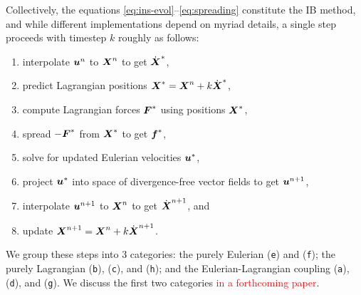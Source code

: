 Collectively, the equations \eqref{eq:ins-evol}--\eqref{eq:spreading} constitute the
IB method, and while different implementations depend on myriad details, a single step
proceeds with timestep $k$ roughly as follows:
\begin{enumerate}[label=(\texttt{\alph*})]
    \item interpolate $\boldsymbol{u}^n$ to $\boldsymbol{X}^n$ to get $\dot{\boldsymbol{X}}^\ast$,
    \item predict Lagrangian positions $\boldsymbol{X}^\ast = \boldsymbol{X}^n + k\dot{\boldsymbol{X}}^\ast$,
    \item compute Lagrangian forces $\boldsymbol{F}^\ast$ using positions $\boldsymbol{X}^\ast$,
    \item spread $-\boldsymbol{F}^\ast$ from $\boldsymbol{X}^\ast$ to get $\boldsymbol{f}^\ast$,
    \item solve for updated Eulerian velocities $\boldsymbol{u}^\ast$,
    \item project $\boldsymbol{u}^\ast$ into space of divergence-free vector fields to get
        $\boldsymbol{u}^{n+1}$,
    \item interpolate $\boldsymbol{u}^{n+1}$ to $\boldsymbol{X}^n$ to get $\dot{\boldsymbol{X}}^{n+1}$, and
    \item update $\boldsymbol{X}^{n+1} = \boldsymbol{X}^n + k \dot{\boldsymbol{X}}^{n+1}$.
\end{enumerate}
We group these steps into 3 categories: the purely Eulerian (\texttt{e}) and
(\texttt{f}); the purely Lagrangian (\texttt{b}), (\texttt{c}), and (\texttt{h}); and the
Eulerian-Lagrangian coupling (\texttt{a}), (\texttt{d}), and (\texttt{g}). We discuss the
first two categories \textcolor{red}{in a forthcoming paper}.
%
%
%
%
